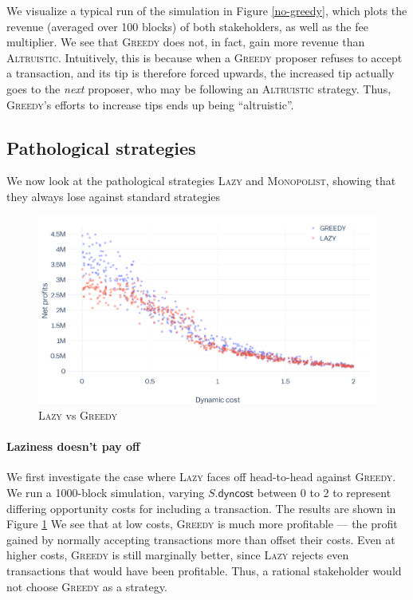 \documentclass[letterpaper,12pt,oneside]{article}
\begin{document}
We visualize a typical run of the simulation in Figure \ref{no-greedy}, which plots the revenue (averaged over 100 blocks) of both stakeholders, as well as the fee multiplier. We see that \textsc{Greedy} does not, in fact, gain more revenue than \textsc{Altruistic}. Intuitively, this is because when a \textsc{Greedy} proposer refuses to accept a transaction, and its tip is therefore forced upwards, the increased tip actually goes to the \emph{next} proposer, who may be following an \textsc{Altruistic} strategy. Thus, \textsc{Greedy}'s efforts to increase tips ends up being ``altruistic''.

\subsection{Pathological strategies}

We now look at the pathological strategies \textsc{Lazy} and \textsc{Monopolist}, showing that they always lose against standard strategies

\begin{figure}[!h]
    \centering
    \includegraphics[width=0.8\linewidth]{greedy-vs-lazy.png}
    \caption{\textsc{Lazy} vs \textsc{Greedy}}
    \label{greedy-vs-lazy}
\end{figure}

\paragraph*{Laziness doesn't pay off} We first investigate the case where \textsc{Lazy} faces off head-to-head against \textsc{Greedy}. We run a 1000-block simulation, varying $S.\mathsf{dyncost}$ between 0 to 2 to represent differing opportunity costs for including a transaction. The results are shown in Figure \ref{greedy-vs-lazy} We see that at low costs, \textsc{Greedy} is much more profitable --- the profit gained by normally accepting transactions more than offset their costs. Even at higher costs, \textsc{Greedy} is still marginally better, since \textsc{Lazy} rejects even transactions that would have been profitable. Thus, a rational stakeholder would not choose \textsc{Greedy} as a strategy.
\end{document}
